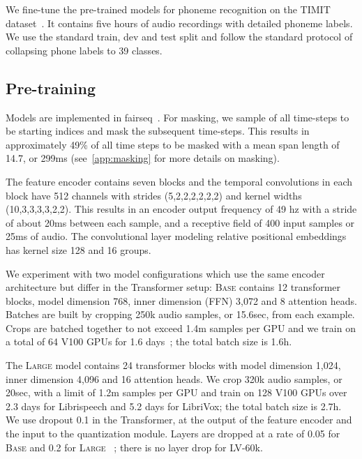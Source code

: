 \documentclass{article}
\newcommand{\wvppbase}{\textsc{Base}}
\newcommand{\wvppbig}{\textsc{Large}}
\newcommand{\vox}{LibriVox}
\newcommand{\libri}{Librispeech}
\newcommand{\voxsz}{LV-60k}
\begin{document}
We fine-tune the pre-trained models for phoneme recognition on the TIMIT dataset~\citep{garofolo1993timit}. 
It contains five hours of audio recordings with detailed phoneme labels.
We use the standard train, dev and test split and follow the standard protocol of collapsing phone labels to 39 classes.

\subsection{Pre-training}
\label{sec:setup-pretrain}

Models are implemented in fairseq~\cite{ott2019fairseq}.
For masking, we sample  of all time-steps to be starting indices and mask the subsequent  time-steps.
This results in approximately 49\% of all time steps to be masked with a mean span length of 14.7, or 299ms (see~\autoref{app:masking} for more details on masking).


The feature encoder contains seven blocks and the temporal convolutions in each block have 512 channels with strides (5,2,2,2,2,2,2) and kernel widths (10,3,3,3,3,2,2).
This results in an encoder output frequency of 49 hz with a stride of about 20ms between each sample, and a receptive field of 400 input samples or 25ms of audio. 
The convolutional layer modeling relative positional embeddings has kernel size 128 and 16 groups.

We experiment with two model configurations which use the same encoder architecture but differ in the Transformer setup: \wvppbase{} contains 12 transformer blocks, model dimension 768, inner dimension (FFN) 3,072 and 8 attention heads. 
Batches are built by cropping 250k audio samples, or 15.6sec, from each example. 
Crops are batched together to not exceed 1.4m samples per GPU and we train on a total of 64 V100 GPUs for 1.6 days~\cite{ott2018scaling}; the total batch size is 1.6h.

The \wvppbig{} model contains 24 transformer blocks with model dimension 1,024, inner dimension 4,096 and 16 attention heads. 
We crop 320k audio samples, or 20sec, with a limit of 1.2m samples per GPU and train on 128 V100 GPUs over 2.3 days for \libri{} and 5.2 days for \vox{}; the total batch size is 2.7h.
We use dropout 0.1 in the Transformer, at the output of the feature encoder and the input to the quantization module. 
Layers are dropped at a rate of 0.05 for \wvppbase{} and 0.2 for \wvppbig{}~ \cite{huang2016deep,fan2019reducing}; there is no layer drop for \voxsz{}.
\end{document}
